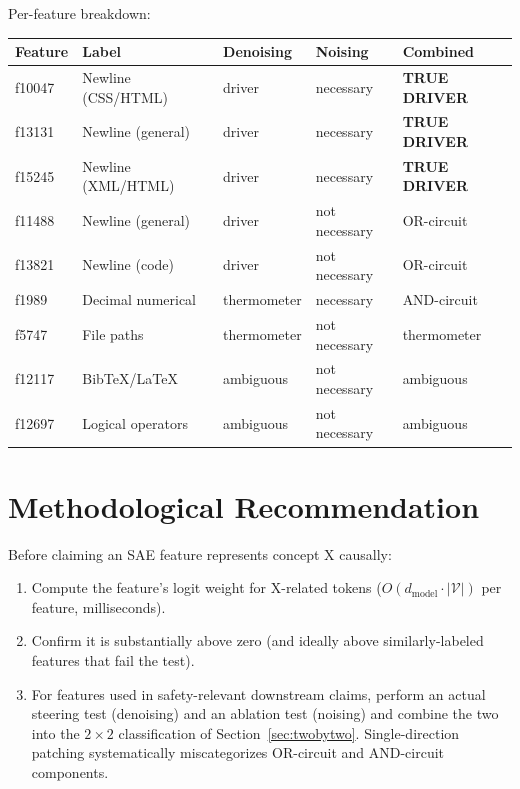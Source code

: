 \documentclass[11pt]{article}
\begin{document}
Per-feature breakdown:
\begin{table}[h]
\centering
\small
\begin{tabular}{lllll}
\toprule
Feature & Label & Denoising & Noising & Combined \\
\midrule
f10047 & Newline (CSS/HTML)      & driver      & necessary     & \textbf{TRUE DRIVER} \\
f13131 & Newline (general)       & driver      & necessary     & \textbf{TRUE DRIVER} \\
f15245 & Newline (XML/HTML)      & driver      & necessary     & \textbf{TRUE DRIVER} \\
f11488 & Newline (general)       & driver      & not necessary & OR-circuit \\
f13821 & Newline (code)          & driver      & not necessary & OR-circuit \\
f1989  & Decimal numerical       & thermometer & necessary     & AND-circuit \\
f5747  & File paths              & thermometer & not necessary & thermometer \\
f12117 & BibTeX/LaTeX            & ambiguous   & not necessary & ambiguous \\
f12697 & Logical operators       & ambiguous   & not necessary & ambiguous \\
\bottomrule
\end{tabular}
\end{table}

\section{Methodological Recommendation}

Before claiming an SAE feature represents concept X causally:
\begin{enumerate}[leftmargin=*]
  \item Compute the feature's logit weight for X-related tokens
        ($O(d_{\text{model}} \cdot |\mathcal{V}|)$ per feature, milliseconds).
  \item Confirm it is substantially above zero (and ideally above similarly-labeled
        features that fail the test).
  \item For features used in safety-relevant downstream claims, perform an
        actual steering test (denoising) and an ablation test (noising) and combine
        the two into the $2\times 2$ classification of Section~\ref{sec:twobytwo}.
        Single-direction patching systematically miscategorizes OR-circuit and
        AND-circuit components.
\end{enumerate}
\end{document}
